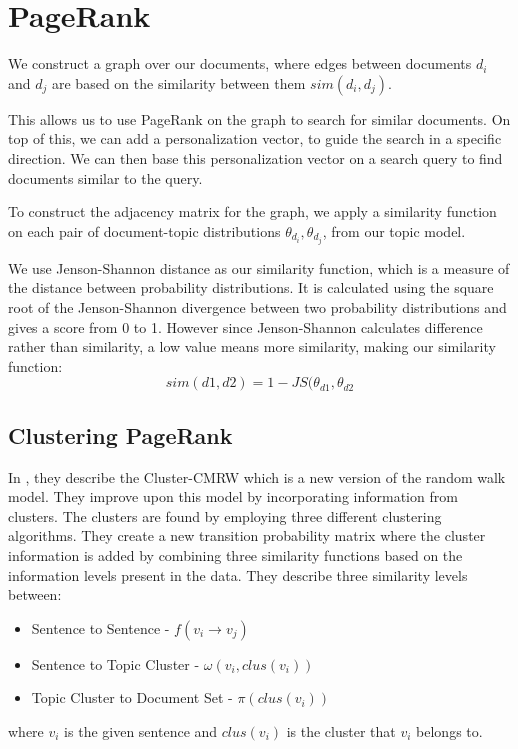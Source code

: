 \section{PageRank}\label{sec:pagerank}
We construct a graph over our documents, where edges between documents $d_i$ and $d_j$ are based on the similarity between them $sim(d_i, d_j)$.

This allows us to use PageRank on the graph to search for similar documents.
On top of this, we can add a personalization vector, to guide the search in a specific direction.
We can then base this personalization vector on a search query to find documents similar to the query.

To construct the adjacency matrix for the graph, we apply a similarity function on each pair of document-topic distributions $\theta_{d_i}, \theta_{d_j}$, from our topic model.

We use Jenson-Shannon distance as our similarity function, which is a measure of the distance between probability distributions\cite{jensen-shannon2003}\cite{jensen-shannondis2003}.
It is calculated using the square root of the Jenson-Shannon divergence between two probability distributions and gives a score from 0 to 1.
However since Jenson-Shannon calculates difference rather than similarity, a low value means more similarity, making our similarity function:
$$sim(d1, d2) = 1 - JS(\theta_{d1}, \theta_{d2}$$


\subsection{Clustering PageRank}

In \cite{ClusterPageRank}, they describe the \gls{Cluster-CMRW} which is a new version of the random walk model. 
They improve upon this model by incorporating information from clusters. 
The clusters are found by employing three different clustering algorithms.
They create a new transition probability matrix where the cluster information is added by combining three similarity functions based on the information levels present in the data.
They describe three similarity levels between:
\begin{itemize}
    \item Sentence to Sentence - $f(v_i \rightarrow v_j)$
    \item Sentence to Topic Cluster - $\omega(v_i, clus(v_i))$
    \item Topic Cluster to Document Set - $\pi(clus(v_i))$
\end{itemize}
where $v_i$ is the given sentence and $clus(v_i)$ is the cluster that $v_i$ belongs to.

